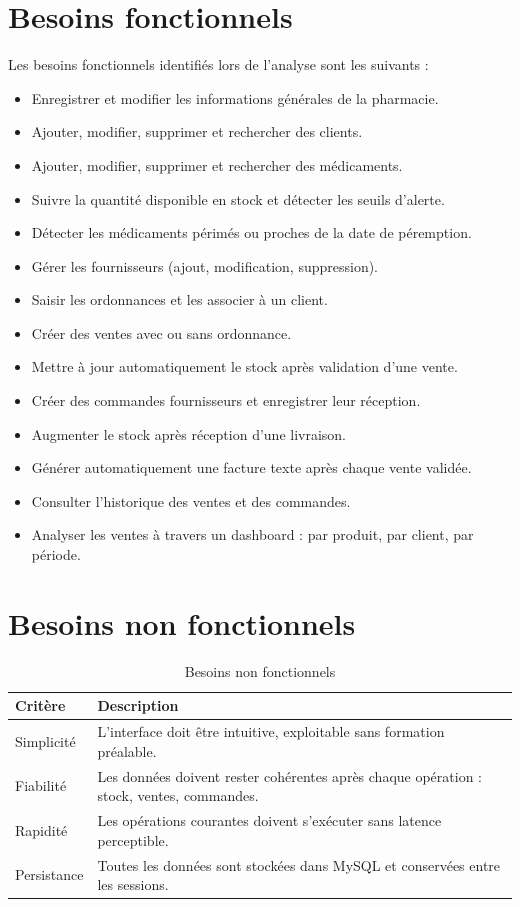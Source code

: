 \documentclass[12pt,a4paper]{report}
\begin{document}
\section{Besoins fonctionnels}

Les besoins fonctionnels identifiés lors de l'analyse sont les suivants :

\begin{itemize}[nosep]
  \item Enregistrer et modifier les informations générales de la pharmacie.
  \item Ajouter, modifier, supprimer et rechercher des clients.
  \item Ajouter, modifier, supprimer et rechercher des médicaments.
  \item Suivre la quantité disponible en stock et détecter les seuils d'alerte.
  \item Détecter les médicaments périmés ou proches de la date de péremption.
  \item Gérer les fournisseurs (ajout, modification, suppression).
  \item Saisir les ordonnances et les associer à un client.
  \item Créer des ventes avec ou sans ordonnance.
  \item Mettre à jour automatiquement le stock après validation d'une vente.
  \item Créer des commandes fournisseurs et enregistrer leur réception.
  \item Augmenter le stock après réception d'une livraison.
  \item Générer automatiquement une facture texte après chaque vente validée.
  \item Consulter l'historique des ventes et des commandes.
  \item Analyser les ventes à travers un dashboard : par produit, par client, par période.
\end{itemize}

\section{Besoins non fonctionnels}

\begin{table}[H]
\centering
\begin{tabularx}{\textwidth}{lX}
\toprule
\textbf{Critère} & \textbf{Description} \\
\midrule
Simplicité       & L'interface doit être intuitive, exploitable sans formation préalable. \\
Fiabilité        & Les données doivent rester cohérentes après chaque opération : stock, ventes, commandes. \\
Rapidité         & Les opérations courantes doivent s'exécuter sans latence perceptible. \\
Persistance      & Toutes les données sont stockées dans MySQL et conservées entre les sessions. \\
\bottomrule
\end{tabularx}
\caption{Besoins non fonctionnels}
\end{table}
\end{document}
